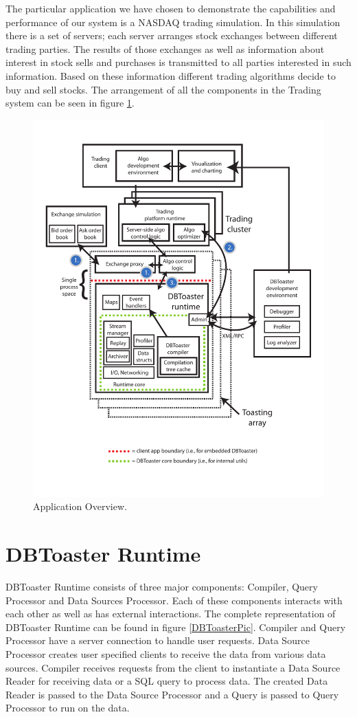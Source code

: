 \documentclass[14pt]{article}
\begin{document}
The particular application we have chosen to demonstrate the capabilities and performance of our system is a NASDAQ trading simulation. In this simulation there is a set of servers; each server arranges stock exchanges between different trading parties. The results of those exchanges as well as information about interest in stock sells and purchases is transmitted to all parties interested in such information. Based on these information different trading algorithms decide to buy and sell stocks. The arrangement of all the components in the Trading system can be seen in figure \ref{TheBigPicture}. 

\begin{figure}
  \includegraphics[width=4.50in]{../figures/finapp.pdf}
  \caption{Application Overview.}
  \label{TheBigPicture}
\end{figure}



\section{DBToaster Runtime}

DBToaster Runtime consists of three major components: Compiler, Query Processor and Data Sources Processor. Each of these components interacts with each other as well as has external interactions. The complete representation of DBToaster Runtime can be found in figure \ref{DBToasterPic}. Compiler and Query Processor have a server connection to handle user requests. Data Source Processor creates user specified clients to receive the data from various data sources. Compiler receives requests from the client to instantiate a Data Source Reader for receiving data or a SQL query to process data. The created Data Reader is passed to the Data Source Processor and a Query is passed to Query Processor to run on the data. 
\end{document}
